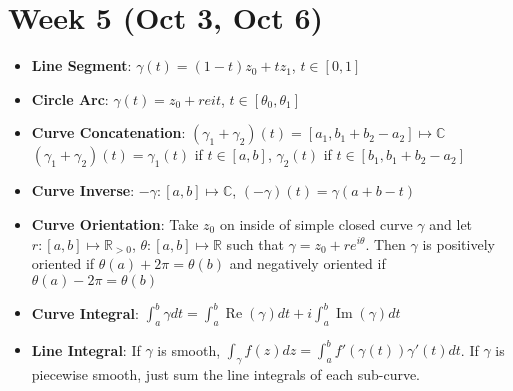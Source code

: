 \documentclass[12pt]{article}
\newcommand{\R}{\mathbb{R}}
\newcommand{\C}{\mathbb{C}}
\DeclareMathOperator{\real}{Re}
\DeclareMathOperator{\imgn}{Im}
\begin{document}
\section*{Week 5 (Oct 3, Oct 6)}
\begin{itemize}
    \item \textbf{Line Segment}: $\gamma(t)=(1-t)z_0+tz_1$, $t\in[0,1]$
    \item \textbf{Circle Arc}: $\gamma(t)=z_0+re{it}$, $t\in[\theta_0,\theta_1]$
    \item \textbf{Curve Concatenation}: $(\gamma_1+\gamma_2)(t)=[a_1,b_1+b_2-a_2]\mapsto\C$\\
    $(\gamma_1+\gamma_2)(t)=\gamma_1(t)$ if $t\in[a,b]$, $\gamma_2(t)$ if $t\in[b_1,b_1+b_2-a_2]$
    \item \textbf{Curve Inverse}: $-\gamma:[a,b]\mapsto\C$, $(-\gamma)(t)=\gamma(a+b-t)$
    \item \textbf{Curve Orientation}: Take $z_0$ on inside of simple closed curve $\gamma$ and let $r:[a,b]\mapsto\R_{>0}$, $\theta:[a,b]\mapsto\R$ such that $\gamma=z_0+re^{i\theta}$. Then $\gamma$ is positively oriented if $\theta(a)+2\pi=\theta(b)$ and negatively oriented if $\theta(a)-2\pi=\theta(b)$
    \item \textbf{Curve Integral}: $\int_a^b\gamma dt=\int_a^b\real(\gamma)dt+i\int_a^b\imgn(\gamma)dt$
    \item \textbf{Line Integral}: If $\gamma$ is smooth, $\int_\gamma f(z)dz=\int_a^bf'(\gamma(t))\gamma'(t)dt$. If $\gamma$ is piecewise smooth, just sum the line integrals of each sub-curve.
\end{itemize}
\end{document}

